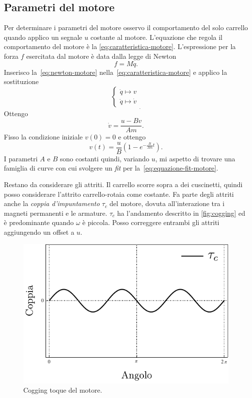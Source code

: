 \subsection{Parametri del motore}
\label{subsec:parametri-motore}
Per determinare i parametri del motore osservo il comportamento del solo
carrello quando applico un segnale $u$ costante al motore.
L'equazione che regola il comportamento del motore è la \eqref{eq:caratteristica-motore}.
L'espressione per la forza $f$
esercitata dal motore è data dalla legge di Newton
\begin{equation}
    f = M \ddot q.
    \label{eq:newton-motore}
\end{equation}
Inserisco la~\eqref{eq:newton-motore} nella~\eqref{eq:caratteristica-motore}
e applico la sostituzione
\begin{equation*}
    \left\{
    \begin{aligned}
        \dot q \mapsto v \\
        \ddot q \mapsto \dot v
    \end{aligned}
    \right.
    _.
    \label{eq:sostituzione-motore}
\end{equation*}
Ottengo
\begin{equation*}
    \dot v = \frac{u - B v} {Am}.
\end{equation*}
Fisso la condizione iniziale $v(0) = 0$ e ottengo
\begin{equation}
    v(t) = \frac u B \left(1 - e^{-\frac B {Am} t}\right).
    \label{eq:equazione-fit-motore}
\end{equation}
I parametri $A$ e $B$ sono costanti quindi, variando $u$, mi aspetto di trovare
una famiglia di curve con cui svolgere un \emph{fit} per la~\eqref{eq:equazione-fit-motore}.

Restano da considerare gli attriti.
Il carrello scorre sopra a dei cuscinetti,
quindi posso considerare l'attrito carrello-rotaia come costante.
Fa parte degli attriti anche la \emph{coppia d'impuntamento} $\tau_c$ del motore,
dovuta all'interazione tra i magneti permanenti e le armature. $\tau_c$ ha
l'andamento descritto in \autoref{fig:cogging} ed è predominante quando $\omega$ è
piccola.
Posso correggere entrambi gli attriti aggiungendo un offset a $u$.



\begin{figure}[t]
    \centering
    \includegraphics{assets/cogging-torque}
    \caption[Cogging torque]{Cogging toque del motore.}
    \label{fig:cogging}
\end{figure}
